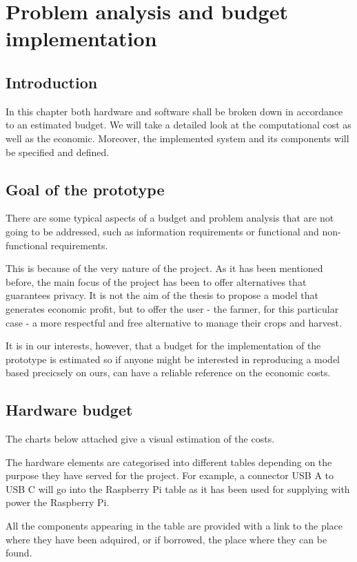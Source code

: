 \chapter{Problem analysis and budget implementation}\label{cap:analisis}

\section{Introduction}
In this chapter both hardware and software shall be broken down in accordance to an estimated budget. We will take a detailed look at the computational cost as well as the economic. Moreover, the implemented system and its components will be specified and defined.

\section{Goal of the prototype}
There are some typical aspects of a budget and problem analysis that are not going to be addressed, such as information requirements or functional and non-functional requirements.

This is because of the very nature of the project. As it has been mentioned before, the main focus of the project has been to offer alternatives that guarantees privacy. It is not the aim of the thesis to propose a model that generates economic profit, but to offer the user - the farmer, for this particular case - a more respectful and free alternative to manage their crops and harvest.

It is in our interests, however, that a budget for the implementation of the prototype is estimated so if anyone might be interested in reproducing a model based precicsely on ours, can have a reliable reference on the economic costs.

\section{Hardware budget}
The charts below attached give a visual estimation of the costs.

The hardware elements are categorised into different tables depending on the purpose they have served for the project. For example, a connector USB A to USB C will go into the Raspberry Pi table as it has been used for supplying with power the Raspberry Pi.

All the components appearing in the table are provided with a link to the place where they have been adquired, or if borrowed, the place where they can be found.

